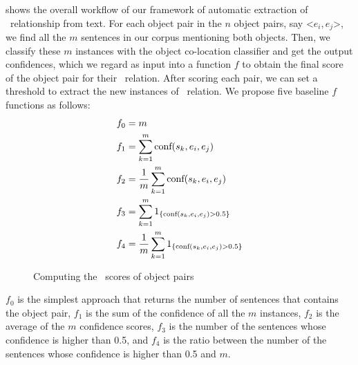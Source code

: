  shows the overall workflow of our framework of
automatic extraction of \lnear\ relationship from text. 
For each object pair in the $n$ object pairs, say \textless$e_i,e_j$\textgreater , 
we find all the $m$ sentences in our corpus mentioning both objects. 
Then, we classify these $m$ instances with the object
co-location classifier and get the output confidences, which we regard as input into a function $f$ to obtain the final score of the object pair for their \lnear\ relation. After scoring each pair, we can set a threshold to extract the new instances of \lnear\ relation.
We propose five baseline $f$ functions as follows:
\begin{align*}
	f_0 &= m\\
	f_1&=\sum_{k=1}^{m} \textnormal{conf}(s_k,e_i,e_j)\\
	f_2&=\frac{1}{m}\sum_{k=1}^{m} \textnormal{conf}(s_k,e_i,e_j)\\
	f_3&=\sum_{k=1}^{m} 
	1_{ \{ \textnormal{conf}(s_k,e_i,e_j)>0.5 \} }\\
	f_4&=\frac{1}{m}\sum_{k=1}^{m} 
	1_{ \{ \textnormal{conf}(s_k,e_i,e_j)>0.5 \} }
\end{align*}
\begin{figure*}[th]
	\centering
	\caption{Computing the \lnear\ scores of object pairs}
	\label{fig:overview}
\end{figure*}
$f_0$ is the simplest approach that returns the number of sentences
that contains the object pair,
$f_1$ is the sum of the confidence of all the $m$ instances, $f_2$ is the average of the $m$ confidence scores, 
$f_3$ is the number of the sentences whose confidence is higher than 0.5, 
and $f_4$ is the ratio between the number of the sentences whose confidence is higher than 0.5 and $m$.


